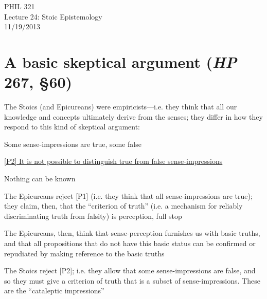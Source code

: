 \documentclass[11pt]{article}
\begin{document}
\thispagestyle{empty}
\begin{center} \LARGE{PHIL 321\\ Lecture 24: Stoic Epistemology}\\ \vspace*{2mm}
\large{11/19/2013}\end{center}
\thispagestyle{empty}\vspace*{3mm}
\vspace*{-8mm}

\section*{A basic skeptical argument (\emph{HP} 267, \S60)}

\noindent The Stoics (and Epicureans) were empiricists---i.e. they think that all our knowledge and concepts ultimately derive from the senses; they differ in how they respond to this kind of skeptical argument:
\vspace*{2mm}

\noindent [P1] Some sense-impressions are true, some false
\vspace*{1mm}

\noindent\underline{[P2] It is not possible to distinguish true from false sense-impressions}
\vspace*{1mm}

\noindent [C] Nothing can be known
\vspace*{2mm}

\noindent The Epicureans reject [P1] (i.e. they think that all sense-impressions are true); they claim, then, that the ``criterion of truth'' (i.e. a mechanism for reliably discriminating truth from falsity) is perception, full stop
\vspace*{2mm}

\noindent The Epicureans, then, think that sense-perception furnishes us with basic truths, and that all propositions that do not have this basic status can be confirmed or repudiated by making reference to the basic truths
\vspace*{2mm}

\noindent The Stoics reject [P2]; i.e. they allow that some sense-impressions are false, and so they must give a criterion of truth that is a subset of sense-impressions. These are the ``cataleptic impressions''
\end{document}
